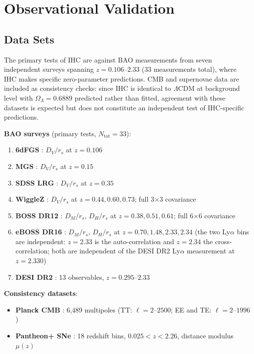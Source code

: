 \documentclass[12pt,a4paper]{article}
\begin{document}
\section{Observational Validation}

\subsection{Data Sets}

The primary tests of IHC are against BAO measurements from seven independent
surveys spanning $z = 0.106$--$2.33$ (33 measurements total), where IHC makes
specific zero-parameter predictions. CMB and supernovae data are included as
consistency checks: since IHC is identical to $\Lambda$CDM at background level with
$\Omega_\Lambda = 0.6889$ predicted rather than fitted, agreement with these datasets
is expected but does not constitute an independent test of IHC-specific predictions.

\textbf{BAO surveys} (primary tests, $N_\mathrm{tot} = 33$):
\begin{enumerate}
  \item \textbf{6dFGS} \citep{Beutler2011}: $D_V/r_s$ at $z = 0.106$
  \item \textbf{MGS} \citep{Ross2015}: $D_V/r_s$ at $z = 0.15$
  \item \textbf{SDSS LRG} \citep{Padmanabhan2012}: $D_V/r_s$ at $z = 0.35$
  \item \textbf{WiggleZ} \citep{Kazin2014}: $D_V/r_s$ at $z = 0.44, 0.60, 0.73$; full 3$\times$3 covariance
  \item \textbf{BOSS DR12} \citep{Alam2017}: $D_M/r_s$, $D_H/r_s$ at $z = 0.38, 0.51, 0.61$; full 6$\times$6 covariance
  \item \textbf{eBOSS DR16} \citep{Alam2021}: $D_M/r_s$, $D_H/r_s$ at $z = 0.70, 1.48, 2.33, 2.34$ (the two Ly$\alpha$ bins are independent: $z = 2.33$ is the auto-correlation and $z = 2.34$ the cross-correlation; both are independent of the DESI DR2 Ly$\alpha$ measurement at $z = 2.330$)
  \item \textbf{DESI DR2} \citep{DESI2025}: 13 observables, $z = 0.295$--$2.33$
\end{enumerate}

\textbf{Consistency datasets}:
\begin{itemize}
  \item \textbf{Planck CMB} \citep{Planck2020}: 6,489 multipoles (TT: $\ell=2$--$2500$; EE and TE: $\ell=2$--$1996$)
  \item \textbf{Pantheon+ SNe} \citep{Pantheon2022}: 18 redshift bins, $0.025 < z < 2.26$, distance modulus $\mu(z)$
\end{itemize}
\end{document}
